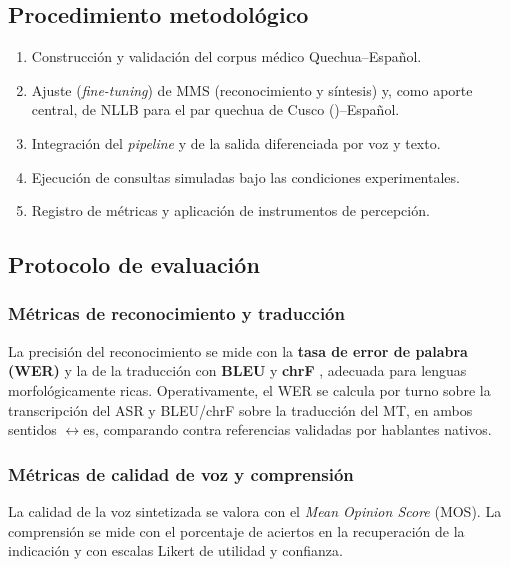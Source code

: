 \subsection{Procedimiento metodol{\'o}gico}
\begin{enumerate}
  \item Construcci{\'o}n y validaci{\'o}n del corpus m{\'e}dico Quechua--Espa{\~n}ol.
  \item Ajuste (\emph{fine-tuning}) de MMS (reconocimiento y s{\'i}ntesis) y, como aporte central, de NLLB para el par quechua de Cusco ()--Espa{\~n}ol.
  \item Integraci{\'o}n del \emph{pipeline} y de la salida diferenciada por voz y texto.
  \item Ejecuci{\'o}n de consultas simuladas bajo las condiciones experimentales.
  \item Registro de m{\'e}tricas y aplicaci{\'o}n de instrumentos de percepci{\'o}n.
\end{enumerate}

\subsection{Protocolo de evaluaci{\'o}n}

\subsubsection{M{\'e}tricas de reconocimiento y traducci{\'o}n}
La precisi{\'o}n del reconocimiento se mide con la \textbf{tasa de error de palabra (WER)} y la de la
traducci{\'o}n con \textbf{BLEU} \parencite{papineni2002bleu} y \textbf{chrF} \parencite{popovic2015chrf},
adecuada para lenguas morfol{\'o}gicamente ricas.  Operativamente, el WER se
calcula por turno sobre la transcripci{\'o}n del ASR y BLEU/chrF sobre la traducci{\'o}n del MT, en
ambos sentidos $\leftrightarrow$es, comparando contra referencias validadas por hablantes
nativos.

\subsubsection{M{\'e}tricas de calidad de voz y comprensi{\'o}n}
La calidad de la voz sintetizada se valora con el \emph{Mean Opinion Score} (MOS). La comprensi{\'o}n
se mide con el porcentaje de aciertos en la recuperaci{\'o}n de la indicaci{\'o}n y con escalas Likert
de utilidad y confianza.


